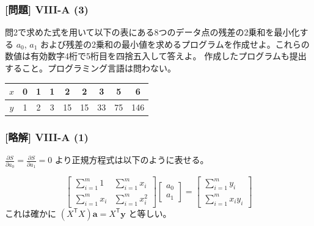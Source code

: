 \documentclass[dvipdfmx,aspectratio=169,20pt]{beamer}
\newcommand{\myfontsetting}[3]{{\fontsize{#1}{#2}\selectfont #3}}
\begin{document}
\begin{frame}
\frametitle{[問題] V\hspace{-.1em}I\hspace{-.1em}I\hspace{-.1em}I-A (3)}

\myfontsetting{15pt}{20pt}{
問2で求めた式を用いて以下の表にある8つのデータ点の残差の2乗和を最小化する $a_0$, $a_1$ および残差の2乗和の最小値を求めるプログラムを作成せよ。これらの数値は有効数字4桁で5桁目を四捨五入して答えよ。
作成したプログラムも提出すること。プログラミング言語は問わない。

\begin{table}[htbp]
    \centering
\begin{tabular}{|c||c|c|c|c|c|c|c|c|}
\hline
$x$ & 0 & 1 & 1 & 2 & 2 & 3 & 5 & 6\\
\hline
$y$ & 1& 2& 3& 15& 15& 33&  75& 146\\
\hline
\end{tabular}
\end{table}
}
\end{frame}
\begin{frame}
\frametitle{[略解] V\hspace{-.1em}I\hspace{-.1em}I\hspace{-.1em}I-A (1)}

\myfontsetting{15pt}{18pt}{ 
\myfontsetting{12pt}{12pt}{
        $\displaystyle \frac{\partial S}{\partial a_0} = \frac{\partial S}{\partial a_1}=0$
}より正規方程式は以下のように表せる。

\myfontsetting{15pt}{20pt}{ 
\begin{equation*}
    \begin{bmatrix}
        \sum_{i=1}^m 1 &
        \sum_{i=1}^m x_i \\
        \sum_{i=1}^m x_i &
        \sum_{i=1}^m x_i^2
    \end{bmatrix}
    \begin{bmatrix}
        a_0\\a_1
    \end{bmatrix} =
    \begin{bmatrix}
        \sum_{i=1}^m y_i\\
        \sum_{i=1}^m x_i y_i
    \end{bmatrix}
\end{equation*}
}
これは確かに $(X^\mathsf{T}X) \bm{a} = X^\mathsf{T} \bm{y}$ と等しい。
}
\end{frame}
\end{document}

